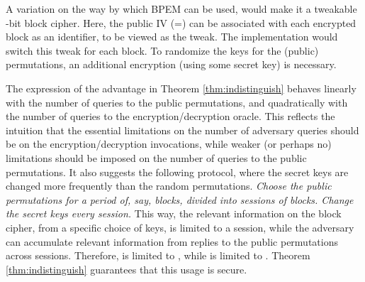 \documentclass{llncs}
\begin{document}
A variation on the way by which BPEM can be used, would make it a tweakable -bit block cipher. Here, the public IV (=) can be associated with each encrypted block as an identifier, to be viewed as the tweak. The implementation would switch this tweak for each block. To randomize the keys for the (public) permutations, an additional encryption (using some secret key) is necessary.

The expression of the advantage in Theorem \ref{thm:indistinguish} behaves linearly with the number of queries to the public permutations, and quadratically with the number of queries to the encryption/decryption oracle.
This reflects the intuition that the essential limitations on the number of adversary queries should be on the encryption/decryption invocations, while weaker (or perhaps no) limitations should be imposed on the number of queries to the public permutations. 
It also suggests the following protocol, where the secret keys are changed more frequently than the random permutations.
{\it 
Choose the public permutations for a period of, say,  blocks, divided into  sessions of  blocks. Change the secret keys every session.}
This way, the relevant information on the block cipher, from a specific choice of keys, is limited to a session, while the adversary can accumulate relevant information from replies to the public permutations across sessions. Therefore,  is limited to , while  is limited to . Theorem \ref{thm:indistinguish} guarantees that this usage is secure.
\end{document}

